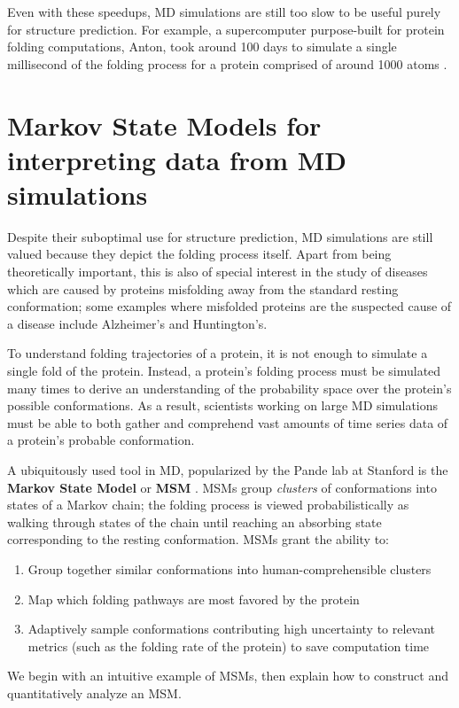 \documentclass{article}
\begin{document}
Even with these speedups, MD simulations are still too slow to be useful purely for structure prediction. For example, a supercomputer purpose-built for protein folding computations, Anton, took around 100 days to simulate a single millisecond of the folding process for a protein comprised of around 1000 atoms \cite{Anton}.

\section{Markov State Models for interpreting data from MD simulations}
Despite their suboptimal use for structure prediction, MD simulations are still valued because they depict the folding process itself. Apart from being theoretically important, this is also of special interest in the study of diseases which are caused by proteins misfolding away from the standard resting conformation; some examples where misfolded proteins are the suspected cause of a disease include Alzheimer's and Huntington's.

To understand folding trajectories of a protein, it is not enough to simulate a single fold of the protein. Instead, a protein's folding process must be simulated many times to derive an understanding of the probability space over the protein's possible conformations. As a result, scientists working on large MD simulations must be able to both gather and comprehend vast amounts of time series data of a protein's probable conformation. 

A ubiquitously used tool in MD, popularized by the Pande lab at Stanford is the \textbf{Markov State Model} or \textbf{MSM} \cite{pande2010}. MSMs group \textit{clusters} of conformations into states of a Markov chain; the folding process is viewed probabilistically as walking through states of the chain until reaching an absorbing state corresponding to the resting conformation. MSMs grant the ability to:

\begin{enumerate}
    \item Group together similar conformations into human-comprehensible clusters
    \item Map which folding pathways are most favored by the protein
    \item Adaptively sample conformations contributing high uncertainty to relevant metrics (such as the folding rate of the protein) to save computation time
\end{enumerate}

We begin with an intuitive example of MSMs, then explain how to construct and quantitatively analyze an MSM.
\end{document}

